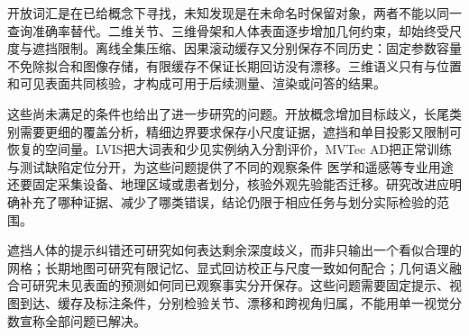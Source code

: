 开放词汇是在已给概念下寻找，未知发现是在未命名时保留对象，两者不能以同一查询准确率替代。二维关节、三维骨架和人体表面逐步增加几何约束，却始终受尺度与遮挡限制。离线全集压缩、因果滚动缓存又分别保存不同历史：固定参数容量不免除拟合和图像存储，有限缓存不保证长期回访没有漂移。三维语义只有与位置和可见表面共同核验，才构成可用于后续测量、渲染或问答的结果。

\Needspace{95mm}
这些尚未满足的条件也给出了进一步研究的问题。开放概念增加目标歧义，长尾类别需要更细的覆盖分析，精细边界要求保存小尺度证据，遮挡和单目投影又限制可恢复的空间量。LVIS把大词表和少见实例纳入分割评价，MVTec AD把正常训练与测试缺陷定位分开，为这些问题提供了不同的观察条件
医学和遥感等专业用途还要固定采集设备、地理区域或患者划分，核验外观先验能否迁移。研究改进应明确补充了哪种证据、减少了哪类错误，结论仍限于相应任务与划分实际检验的范围。

遮挡人体的提示纠错还可研究如何表达剩余深度歧义，而非只输出一个看似合理的网格；长期地图可研究有限记忆、显式回访校正与尺度一致如何配合；几何语义融合可研究未见表面的预测如何同已观察事实分开保存。这些问题需要固定提示、视图到达、缓存及标注条件，分别检验关节、漂移和跨视角归属，不能用单一视觉分数宣称全部问题已解决。
